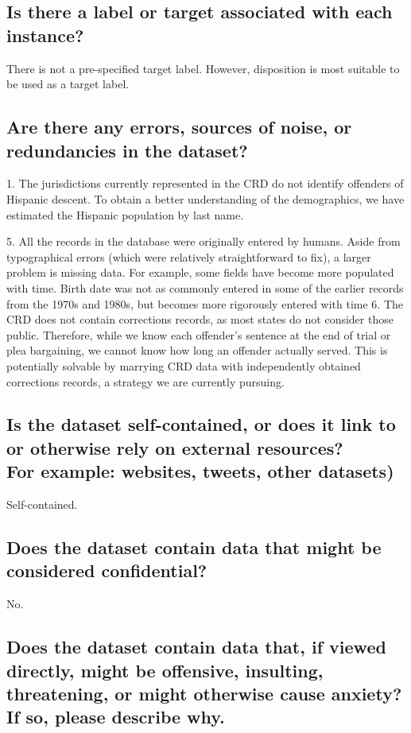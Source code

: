 \documentclass[letterpaper, 10 pt, conference]{ieeeconf}  %
\newcommand{\subtitle}[1]{{\\ \small \normalfont \color{purple} #1}}
\begin{document}
\subsection{Is there a label or target associated with each instance?}

There is not a pre-specified target label. However, disposition is most suitable to be used as a target label. 


\subsection{Are there any errors, sources of noise, or redundancies in the dataset?}

1. The jurisdictions currently represented in the CRD do
not identify offenders of Hispanic descent. To obtain a
better understanding of the demographics, we have
estimated the Hispanic population by last name.

5. All the records in the database were originally
entered by humans. Aside from typographical errors
(which were relatively straightforward to fix), a larger problem is missing data. For example, some fields have become more populated with time. Birth date was not
as commonly entered in some of the earlier records
from the 1970s and 1980s, but becomes more rigorously entered with time 6. The CRD does not contain corrections records, as
most states do not consider those public. Therefore,
while we know each offender’s sentence at the end of
trial or plea bargaining, we cannot know how long an
offender actually served. This is potentially solvable by
marrying CRD data with independently obtained
corrections records, a strategy we are currently
pursuing.

\subsection{Is the dataset self-contained, or does it link to or otherwise rely on external resources? \subtitle{For example: websites, tweets, other datasets)}}

Self-contained. 

\subsection{Does the dataset contain data that might be considered confidential?}

No.

\subsection{Does the dataset contain data that, if viewed directly, might be offensive, insulting, threatening, or might otherwise cause anxiety? \subtitle{If so, please describe why.}}
\end{document}
